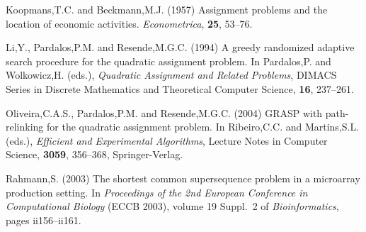 \documentclass[english]{lni}
\begin{document}
\begin{thebibliography}{}
 Koopmans,T.C. and
Beckmann,M.J. (1957) Assignment problems and the location of economic
activities. {\it Econometrica}, {\bf 25}, 53--76.

 Li,Y., Pardalos,P.M. and Resende,M.G.C.
(1994) A greedy randomized adaptive search procedure for the quadratic
assignment problem. In Pardalos,P. and Wolkowicz,H. (eds.), {\it Quadratic
Assignment and Related Problems}, DIMACS Series in Discrete Mathematics and
Theoretical Computer Science, {\bf 16}, 237--261.

 Oliveira,C.A.S., Pardalos,P.M.
and Resende,M.G.C. (2004) GRASP with path-relinking for the quadratic assignment
problem. In Ribeiro,C.C. and Martins,S.L. (eds.), {\it Efficient and
Experimental Algorithms}, Lecture Notes in Computer Science, {\bf 3059},
356--368, Springer-Verlag.

Rahmann,S. (2003) The shortest common supersequence problem in a microarray
production setting. In {\it Proceedings of the 2nd European Conference in
Computational Biology} ({ECCB} 2003), volume 19 Suppl.~2 of
{\it Bioinformatics}, pages ii156--ii161.

\end{thebibliography}
\end{document}
